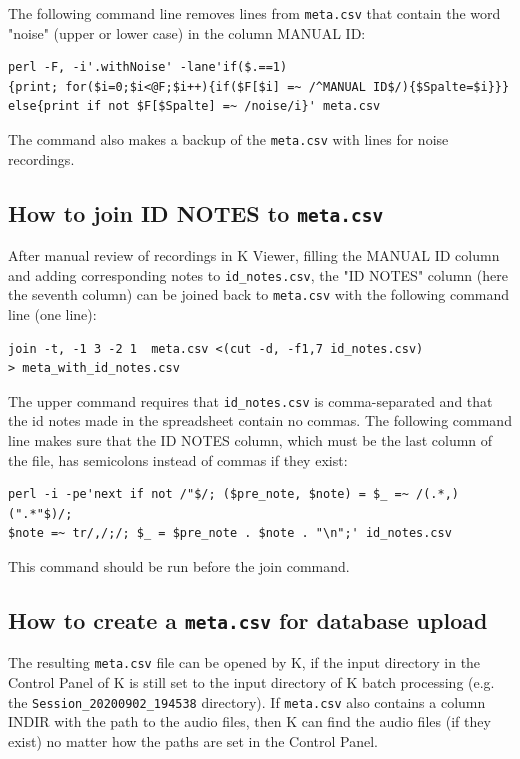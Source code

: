 \documentclass[English, 11pt, twoside, authoryear]{article}
\begin{document}
The following command line removes lines from \texttt{meta.csv} that contain the word "noise" (upper or lower case) in the column MANUAL ID:

\begin{lstlisting}
perl -F, -i'.withNoise' -lane'if($.==1)
{print; for($i=0;$i<@F;$i++){if($F[$i] =~ /^MANUAL ID$/){$Spalte=$i}}}
else{print if not $F[$Spalte] =~ /noise/i}' meta.csv
\end{lstlisting}

The command also makes a backup of the \texttt{meta.csv} with lines for noise recordings.

%
%
\subsection{How to join ID NOTES to \texttt{meta.csv}}
%
%

After manual review of recordings in \textsf{K} Viewer, filling the MANUAL ID column and adding corresponding notes to \texttt{id\_notes.csv}, the "ID NOTES" column (here the seventh column) can be joined back to \texttt{meta.csv} with the following command line (one line):

\begin{lstlisting}
join -t, -1 3 -2 1  meta.csv <(cut -d, -f1,7 id_notes.csv) 
> meta_with_id_notes.csv
\end{lstlisting}

The upper command requires that \texttt{id\_notes.csv} is comma-separated and that the id notes made in the spreadsheet contain no commas. The following command line makes sure that the ID NOTES column, which must be the last column of the file, has semicolons instead of commas if they exist:

\begin{lstlisting}[numbers=none]
perl -i -pe'next if not /"$/; ($pre_note, $note) = $_ =~ /(.*,)(".*"$)/; 
$note =~ tr/,/;/; $_ = $pre_note . $note . "\n";' id_notes.csv
\end{lstlisting}

This command should be run before the \textsf{join} command.

%
%
\subsection{How to create a \texttt{meta.csv} for database upload}
%
%
The resulting \texttt{meta.csv} file can be opened by \textsf{K}, if the input directory in the Control Panel of \textsf{K} is still set to the input directory of \textsf{K} batch processing (e.g. the \texttt{Session\_20200902\_194538} directory). If \texttt{meta.csv} also contains a column \textsc{INDIR} with the path to the audio files, then \textsf{K} can find the audio files (if they exist) no matter how the paths are set in the Control Panel.
\end{document}
